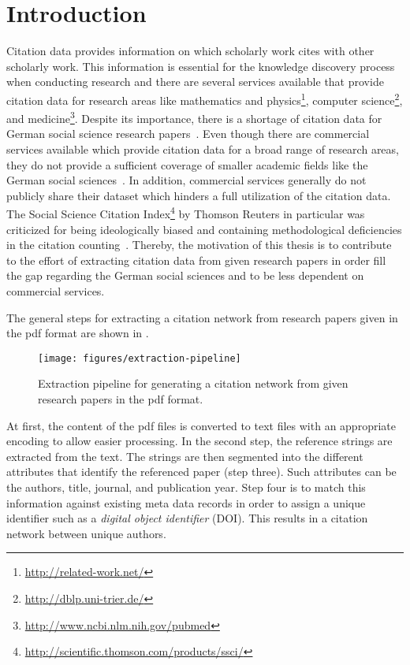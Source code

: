 \chapter{Introduction}\label{cha:introduction}


Citation data provides information on which scholarly work cites with other scholarly work.
This information is essential for the knowledge discovery process when conducting research and there are several services available that provide citation data for research areas like mathematics and physics\footnote{\url{http://related-work.net/}}, computer science\footnote{\url{http://dblp.uni-trier.de/}}, and medicine\footnote{\url{http://www.ncbi.nlm.nih.gov/pubmed}}.
Despite its importance, there is a shortage of citation data for German social science research papers~\citep{herb2015open}.
Even though there are commercial services available which provide citation data for a broad range of research areas, they do not provide a sufficient coverage of smaller academic fields like the German social sciences~\citep{mayr2007exploratory}.
In addition, commercial services generally do not publicly share their dataset which hinders a full utilization of the citation data.
The Social Science Citation Index\footnote{\url{http://scientific.thomson.com/products/ssci/}} by Thomson Reuters in particular was criticized for being ideologically biased and containing methodological deficiencies in the citation counting~\cite{klein2004social}.
Thereby, the motivation of this thesis is to contribute to the effort of extracting citation data from given research papers in order fill the gap regarding the German social sciences and to be less dependent on commercial services.

\bigskip

The general steps for extracting a citation network from research papers given in the \gls{pdf} format are shown in .
\begin{figure}[t]
\texttt{[image: figures/extraction-pipeline]}
\caption{Extraction pipeline for generating a citation network from given research papers in the \gls{pdf} format.}
\label{fig:extraction-pipeline}
\end{figure}
At first, the content of the \gls{pdf} files is converted to text files with an appropriate encoding to allow easier processing.
In the second step, the reference strings are extracted from the text.
The strings are then segmented into the different attributes that identify the referenced paper (step three).
Such attributes can be the authors, title, journal, and publication year.
Step four is to match this information against existing meta data records in order to assign a unique identifier such as a \textit{digital object identifier} (DOI).
This results in a citation network between unique authors.

